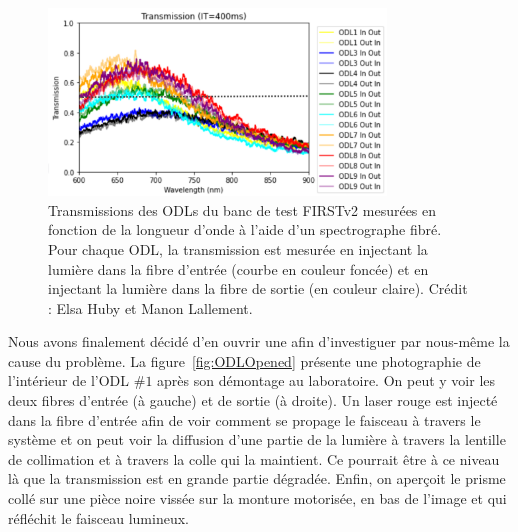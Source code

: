 \begin{figure}[ht!]
    \centering
    \includegraphics[width=0.8\textwidth]{Figure_Chap2/ODL_Throughput_VS_Wavelength.png}
    \caption[Transmissions des ODLs du banc de test FIRSTv2 mesurées en fonction de la longueur d'onde.]{Transmissions des ODLs du banc de test FIRSTv2 mesurées en fonction de la longueur d'onde à l'aide d'un spectrographe fibré. Pour chaque ODL, la transmission est mesurée en injectant la lumière dans la fibre d'entrée (courbe en couleur foncée) et en injectant la lumière dans la fibre de sortie (en couleur claire). Crédit : Elsa Huby et Manon Lallement.}
    \label{fig:ODLThroughput}
\end{figure}

Nous avons finalement décidé d'en ouvrir une afin d'investiguer par nous-même la cause du problème. La figure~\ref{fig:ODLOpened} présente une photographie de l'intérieur de l'\ac{ODL} $\#1$ après son démontage au laboratoire. On peut y voir les deux fibres d'entrée (à gauche) et de sortie (à droite). Un laser rouge est injecté dans la fibre d'entrée afin de voir comment se propage le faisceau à travers le système et on peut voir la diffusion d'une partie de la lumière à travers la lentille de collimation et à travers la colle qui la maintient. Ce pourrait être à ce niveau là que la transmission est en grande partie dégradée. Enfin, on aperçoit le prisme collé sur une pièce noire vissée sur la monture motorisée, en bas de l'image et qui réfléchit le faisceau lumineux.

